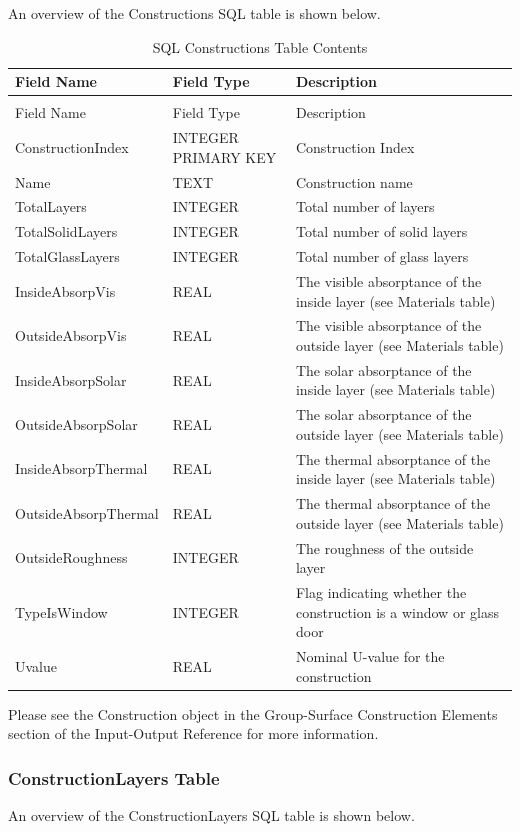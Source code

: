 An overview of the Constructions SQL table is shown below.

\begin{longtable}[c]{>{\raggedright}p{1.5in}>{\raggedright}p{1.5in}>{\raggedright}p{3.0in}}
\caption{SQL Constructions Table Contents \label{table:table-26.-sql-constructions-table-contents}} \tabularnewline
\toprule
Field Name & Field Type & Description \tabularnewline
\midrule
\endfirsthead

\caption[]{SQL Constructions Table Contents} \tabularnewline
\toprule
Field Name & Field Type & Description \tabularnewline
\midrule
\endhead

Construction\-Index & INTEGER PRIMARY KEY & Construction Index \tabularnewline
Name & TEXT & Construction name \tabularnewline
TotalLayers & INTEGER & Total number of layers \tabularnewline
TotalSolidLayers & INTEGER & Total number of solid layers \tabularnewline
TotalGlassLayers & INTEGER & Total number of glass layers \tabularnewline
InsideAbsorpVis & REAL & The visible absorptance of the inside layer (see Materials table) \tabularnewline
OutsideAbsorpVis & REAL & The visible absorptance of the outside layer (see Materials table) \tabularnewline
InsideAbsorpSolar & REAL & The solar absorptance of the inside layer (see Materials table) \tabularnewline
OutsideAbsorpSolar & REAL & The solar absorptance of the outside layer (see Materials table) \tabularnewline
InsideAbsorp\-Thermal & REAL & The thermal absorptance of the inside layer (see Materials table) \tabularnewline
OutsideAbsorp\-Thermal & REAL & The thermal absorptance of the outside layer (see Materials table) \tabularnewline
OutsideRoughness & INTEGER & The roughness of the outside layer \tabularnewline
TypeIsWindow & INTEGER & Flag indicating whether the construction is a window or glass door \tabularnewline
Uvalue & REAL & Nominal U-value for the construction \tabularnewline
\bottomrule
\end{longtable}

Please see the Construction object in the Group-Surface Construction Elements section of the Input-Output Reference for more information.

\subsubsection{ConstructionLayers Table}

An overview of the ConstructionLayers SQL table is shown below.

